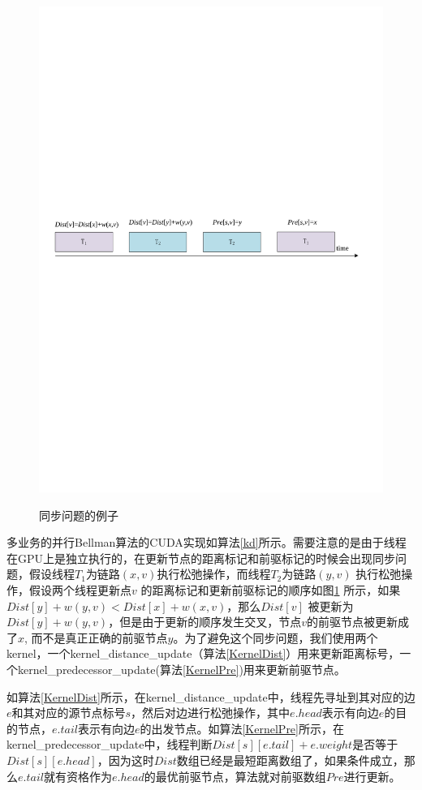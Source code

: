 \begin{figure}
\setlength{\abovecaptionskip}{-0.5cm}
\begin{center}
{\includegraphics[width=0.8 \textwidth]{figures/SynPro.pdf}}
\end{center}
\caption{{\footnotesize{同步问题的例子}}}
\label{SynPro}
\end{figure}
多业务的并行Bellman算法的CUDA实现如算法\ref{kd}所示。需要注意的是由于线程在GPU上是独立执行的，在更新节点的距离标记和前驱标记的时候会出现同步问题，假设线程$T_1$为链路$(x,v)$执行松弛操作，而线程$T_2$为链路$(y,v)$ 执行松弛操作，假设两个线程更新点$v$ 的距离标记和更新前驱标记的顺序如图\ref{SynPro} 所示，如果$Dist[y] + w(y, v) < Dist[x] +w(x, v)$，那么$Dist[v]$ 被更新为$Dist[y] + w(y, v)$，但是由于更新的顺序发生交叉，节点$v$的前驱节点被更新成了$x$, 而不是真正正确的前驱节点$y$。为了避免这个同步问题，我们使用两个kernel，一个kernel\_distance\_update（算法\ref{KernelDist}）用来更新距离标号，一个kernel\_predecessor\_update(算法\ref{KernelPre})用来更新前驱节点。

如算法\ref{KernelDist}所示，在kernel\_distance\_update中，线程先寻址到其对应的边$e$和其对应的源节点标号$s$，然后对边进行松弛操作，其中$e.head$表示有向边$e$的目的节点，$e.tail$表示有向边$e$的出发节点。如算法\ref{KernelPre}所示，在kernel\_predecessor\_update中，线程判断$Dist[s][e.tail] + e.weight$是否等于$Dist[s][e.head]$，因为这时$Dist$数组已经是最短距离数组了，如果条件成立，那么$e.tail$就有资格作为$e.head$的最优前驱节点，算法就对前驱数组$Pre$进行更新。

